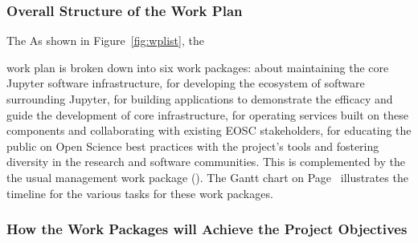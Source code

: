 

\subsubsection{Overall Structure of the Work Plan}\label{sec:workplan-structure}
\ifgrantagreement
The
\else
As shown in Figure~\ref{fig:wplist}, the
\fi

work plan is broken down into
six work packages:
 about maintaining the core Jupyter software infrastructure,
 for developing the ecosystem of software surrounding Jupyter,
 for building applications to demonstrate the efficacy and guide the development
of core infrastructure,
 for operating services built on these
components and collaborating with existing EOSC stakeholders,
 for educating the public on Open Science best practices with the project's tools
and fostering diversity in the research and software communities.
This is complemented by the
the usual management  work package
(). The Gantt chart on
Page~\pageref{fig:gantt} illustrates the timeline for the various
tasks for these work packages.

\ifgrantagreement\else
\wpfigstyle{\footnotesize\def\tabcolsep{3.5pt}}
{\wpfig}
\fi

\subsubsection{How the Work Packages will Achieve the Project Objectives}
\label{sssec:how_the_work_packages_will_achieve}

